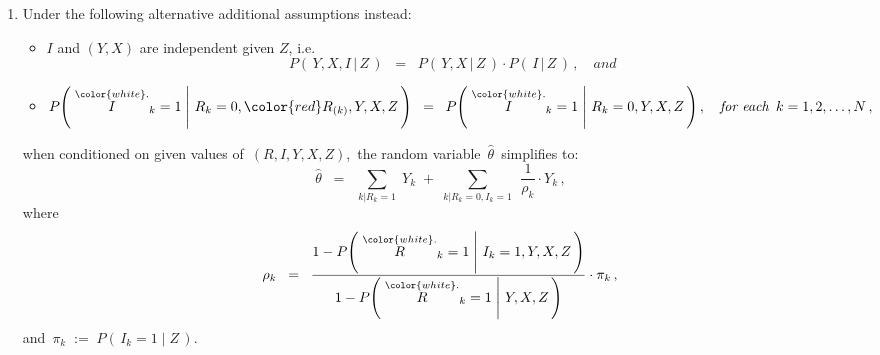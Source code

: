 \begin{proposition}
\begin{enumerate}
\item
	Under the following alternative additional assumptions instead:
	\begin{itemize}
	\item
		$I$ and $(Y,X)$ are independent given $Z$, i.e.
		\begin{equation*}
		P\!\left(\,Y,X,I\,\vert\,Z\,\right)
		\;\; = \;\;
			P\!\left(\,Y,X\,\vert\,Z\,\right)
			\cdot
			P\!\left(\,I\,\vert\,Z\,\right)\,,
			\quad
			\textit{and}
		\end{equation*}
	\item
		\begin{equation*}
		P\!\left(\,\left.\overset{{\color{white}.}}{I}_{k} = 1\;\right\vert\,R_{k}=0,{\color{red}R_{(k)}},Y,X,Z\,\right)
		\;\; = \;\;
			P\!\left(\,\left.\overset{{\color{white}.}}{I}_{k} = 1\;\right\vert\,R_{k}=0,Y,X,Z\,\right),
		\quad
		\textit{for each \,$k = 1,2,\ldots,N$}\,,
		\end{equation*}
	\end{itemize}
	when conditioned on given values of \,$(R,I,Y,X,Z)$,\, the random variable \,$\widehat{\theta}$\, simplifies to:
	\begin{equation*}
	\widehat{\theta}
	\;\; = \;\;
		\underset{k\vert R_{k}=1}{\sum}\; Y_{k}
		\; + \;
		\underset{k\vert R_{k}=0,I_{k}=1}{\sum}\;\, \dfrac{1}{\rho_{k}}\cdot Y_{k}\,,
	\end{equation*}
	where
	\begin{equation*}
	\rho_{k}
	\;\; = \;\;
		\dfrac{
			1 - P\!\left(\,\left.\overset{{\color{white}.}}{R}_{k}=1\;\right\vert\,I_{k}=1,Y,X,Z\,\right)
			}{
			1 - P\!\left(\,\left.\overset{{\color{white}.}}{R}_{k}=1\;\right\vert\,Y,X,Z\,\right)
			}
		\cdot
		\pi_{k}\,,
	\end{equation*}
	and \,$\pi_{k} \; := \; P(\,I_{k}=1\;\vert\;Z\,)$.
\end{enumerate}
\end{proposition}
\proof
